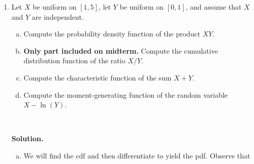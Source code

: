\begin{enumerate}[(1)]


\item 



Let \(X\) be uniform on \([1, 5]\), let \(Y\) be uniform on \([0, 1]\), and assume that \(X\) and \(Y\) are independent.

\begin{enumerate}[(a)]

\item Compute the probability density function of the product \(XY\).

\item \textbf{Only part included on midterm.} Compute the cumulative distribution function of the ratio \(X/Y\).

\item Compute the characteristic function of the sum \(X + Y\).

\item Compute the moment-generating function of the random variable \(X - \ln (Y)\).

\end{enumerate}

\

\textbf{Solution.}

\begin{enumerate}[(a)]





\item We will find the cdf and then differentiate to yield the pdf. Observe that


\end{enumerate}
\end{enumerate}
